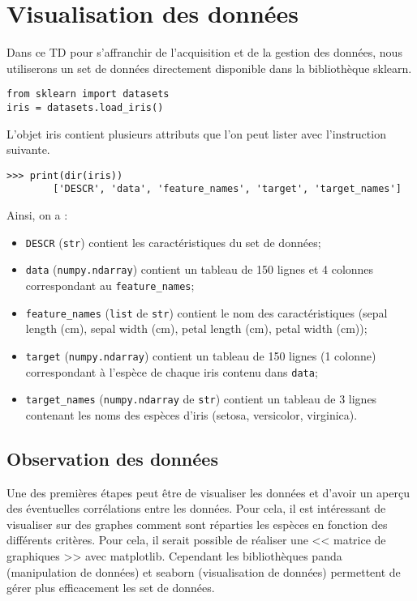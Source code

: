\section{Visualisation des données}
Dans ce TD pour s'affranchir de l'acquisition et de la gestion des données, nous utiliserons un set de données directement disponible dans la bibliothèque sklearn.

\begin{verbatim}
from sklearn import datasets
iris = datasets.load_iris()
\end{verbatim}

L'objet iris contient plusieurs attributs que l'on peut lister avec l'instruction suivante. 

\begin{verbatim}
>>> print(dir(iris))
        ['DESCR', 'data', 'feature_names', 'target', 'target_names']
\end{verbatim}

Ainsi, on a :
\begin{itemize}
\item \texttt{DESCR} (\texttt{str}) contient les caractéristiques du set de données;
\item \texttt{data} (\texttt{numpy.ndarray}) contient un tableau de 150 lignes et 4 colonnes correspondant au \texttt{feature\_names};
\item \texttt{feature\_names} (\texttt{list} de \texttt{str}) contient le nom des caractéristiques (sepal length (cm), sepal width (cm), petal length (cm), petal width (cm));
\item \texttt{target} (\texttt{numpy.ndarray}) contient un tableau de 150 lignes (1 colonne) correspondant à l'espèce de chaque iris contenu dans \texttt{data};
\item \texttt{target\_names} (\texttt{numpy.ndarray} de \texttt{str}) contient un tableau de 3 lignes contenant les noms des espèces d'iris (setosa, versicolor, virginica).
\end{itemize}

\subsection{Observation des données}
Une des premières étapes peut être de visualiser les données et d'avoir un aperçu des éventuelles corrélations entre les données. Pour cela, il est intéressant de visualiser sur des graphes comment sont réparties les espèces en fonction des différents critères. 
Pour cela, il serait possible de réaliser une << matrice de graphiques >> avec matplotlib. Cependant les bibliothèques panda (manipulation de données) et seaborn (visualisation de données) permettent de gérer plus efficacement les set de données. 

